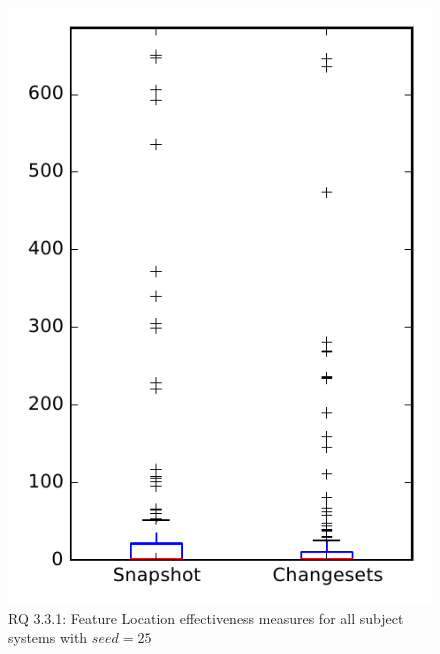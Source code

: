 
\begin{figure}
\centering
\includegraphics[height=0.4\textheight]{figures/flt_seed/rq1_overview_25}
\caption{RQ 3.3.1: Feature Location effectiveness measures for all subject systems with $seed=25$}
\label{fig:flt_seed:rq1:overview}
\end{figure}
